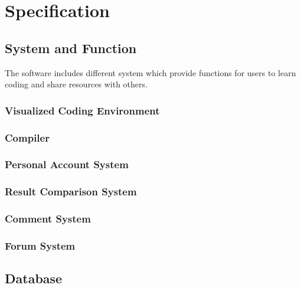\chapter{Specification}
\section{System and Function}
The software includes different system which provide functions for users to learn coding and share resources with others.
\subsection{Visualized Coding Environment}
	
\subsection{Compiler}
\subsection{Personal Account System}
	
\subsection{Result Comparison System}
\subsection{Comment System}

\subsection{Forum System}
\section{Database}
